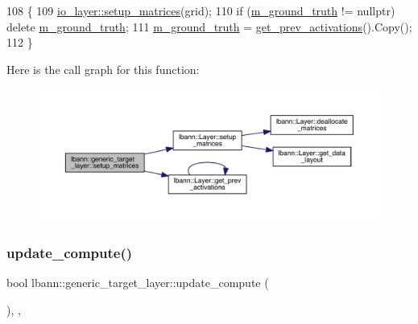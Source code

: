 \begin{DoxyCode}
108                                                    \{
109     \hyperlink{classlbann_1_1Layer_a57bbe21131dc00ab5cf9ea5e3656808e}{io\_layer::setup\_matrices}(grid);
110     \textcolor{keywordflow}{if} (\hyperlink{classlbann_1_1generic__target__layer_acb9ba351caf22b8e2378e4cd1e256da7}{m\_ground\_truth} != \textcolor{keyword}{nullptr}) \textcolor{keyword}{delete} \hyperlink{classlbann_1_1generic__target__layer_acb9ba351caf22b8e2378e4cd1e256da7}{m\_ground\_truth};
111     \hyperlink{classlbann_1_1generic__target__layer_acb9ba351caf22b8e2378e4cd1e256da7}{m\_ground\_truth} = \hyperlink{classlbann_1_1Layer_a45853df73a2e72bfaa774665a0f37ed7}{get\_prev\_activations}().Copy();
112   \}
\end{DoxyCode}
Here is the call graph for this function\+:\nopagebreak
\begin{figure}[H]
\begin{center}
\leavevmode
\includegraphics[width=350pt]{classlbann_1_1generic__target__layer_af8bcdbd313c9793187fe6e53396e3356_cgraph}
\end{center}
\end{figure}
\mbox{\label{classlbann_1_1generic__target__layer_a43f4de7c1846b605aa9bb6daf9338c78}} 
\subsubsection{\texorpdfstring{update\+\_\+compute()}{update\_compute()}}
{\footnotesize\ttfamily bool lbann\+::generic\+\_\+target\+\_\+layer\+::update\+\_\+compute (\begin{DoxyParamCaption}{ }\end{DoxyParamCaption})\hspace{0.3cm}{\ttfamily [inline]}, {\ttfamily [override]}, {\ttfamily [virtual]}}

